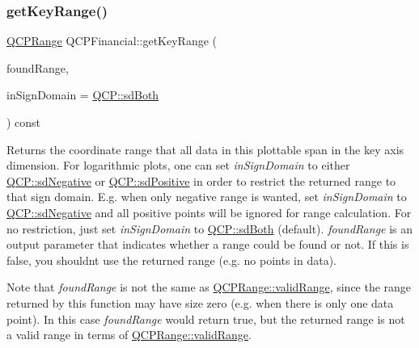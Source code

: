 \subsubsection{\texorpdfstring{get\+Key\+Range()}{getKeyRange()}}
{\footnotesize\ttfamily \mbox{\hyperlink{class_q_c_p_range}{Q\+C\+P\+Range}} Q\+C\+P\+Financial\+::get\+Key\+Range (\begin{DoxyParamCaption}\item[{bool \&}]{found\+Range,  }\item[{\mbox{\hyperlink{namespace_q_c_p_afd50e7cf431af385614987d8553ff8a9}{Q\+C\+P\+::\+Sign\+Domain}}}]{in\+Sign\+Domain = {\ttfamily \mbox{\hyperlink{namespace_q_c_p_afd50e7cf431af385614987d8553ff8a9aa38352ef02d51ddfa4399d9551566e24}{Q\+C\+P\+::sd\+Both}}} }\end{DoxyParamCaption}) const\hspace{0.3cm}{\ttfamily [virtual]}}

Returns the coordinate range that all data in this plottable span in the key axis dimension. For logarithmic plots, one can set {\itshape in\+Sign\+Domain} to either \mbox{\hyperlink{namespace_q_c_p_afd50e7cf431af385614987d8553ff8a9a2d18af0bc58f6528d1e82ce699fe4829}{Q\+C\+P\+::sd\+Negative}} or \mbox{\hyperlink{namespace_q_c_p_afd50e7cf431af385614987d8553ff8a9a584784b75fb816abcc627cf743bb699f}{Q\+C\+P\+::sd\+Positive}} in order to restrict the returned range to that sign domain. E.\+g. when only negative range is wanted, set {\itshape in\+Sign\+Domain} to \mbox{\hyperlink{namespace_q_c_p_afd50e7cf431af385614987d8553ff8a9a2d18af0bc58f6528d1e82ce699fe4829}{Q\+C\+P\+::sd\+Negative}} and all positive points will be ignored for range calculation. For no restriction, just set {\itshape in\+Sign\+Domain} to \mbox{\hyperlink{namespace_q_c_p_afd50e7cf431af385614987d8553ff8a9aa38352ef02d51ddfa4399d9551566e24}{Q\+C\+P\+::sd\+Both}} (default). {\itshape found\+Range} is an output parameter that indicates whether a range could be found or not. If this is false, you shouldn\textquotesingle{}t use the returned range (e.\+g. no points in data).

Note that {\itshape found\+Range} is not the same as \mbox{\hyperlink{class_q_c_p_range_ab38bd4841c77c7bb86c9eea0f142dcc0}{Q\+C\+P\+Range\+::valid\+Range}}, since the range returned by this function may have size zero (e.\+g. when there is only one data point). In this case {\itshape found\+Range} would return true, but the returned range is not a valid range in terms of \mbox{\hyperlink{class_q_c_p_range_ab38bd4841c77c7bb86c9eea0f142dcc0}{Q\+C\+P\+Range\+::valid\+Range}}.

